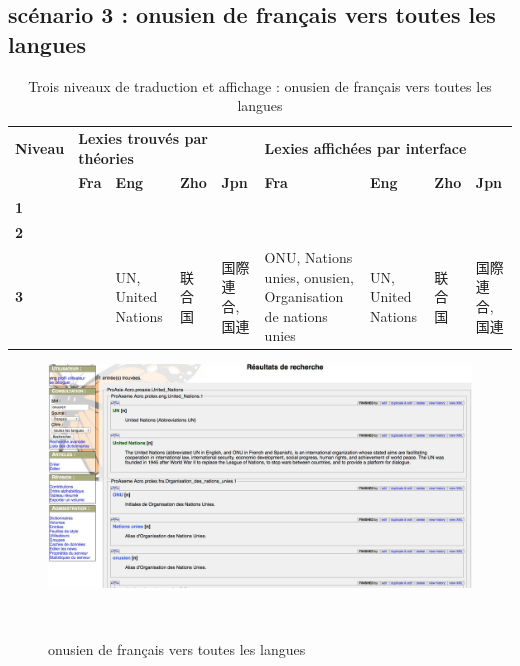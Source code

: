 \documentclass[10pt,a4paper,twoside]{article}
\newcommand{\Chinois}[1]{{\fontspec[Scale=0.9]{STSong}#1}}
\newcommand{\Japonais}[1]{{\fontspec[Scale=0.9]{Hiragino Kaku Gothic Pro}#1}}
\begin{document}
\subsection{scénario 3 :  onusien de français vers toutes les langues}
\begin{table}[!h]
\centering
	\begin{tabular}{|p{1cm}|p{1.8cm}|p{1cm}|p{1cm}|p{0.5cm}|p{1.8cm}|p{1cm}|p{1cm}|p{1cm}|}
	\hline
	\textbf{Niveau} & \multicolumn{4}{l|}{\textbf{ Lexies trouvés par théories}}&\multicolumn{4}{l|}{\textbf{Lexies affichées par interface}} \\
	\cline{2-9}
	&\textbf{Fra} & \textbf{Eng} & \textbf{Zho} & \textbf{Jpn} & \textbf{Fra} & \textbf{Eng}  & \textbf{Zho} & \textbf{Jpn} \\
	\hline
	\textbf{1} &  &  &  &  &  &  &  &   \\
	\hline
	\textbf{2} &  &  &  & &  &  &  & \\
	\hline
	\textbf{3} &  & \raggedright UN, United Nations & \raggedright \Chinois{联合国} &\raggedright \Japonais{国際連合}, \Japonais{国連} & \raggedright ONU, Nations unies, onusien, Organisation de nations unies  & \raggedright UN, United Nations &  \raggedright \Chinois{联合国} & \Japonais{国際連合}, \Japonais{国連} \\
	\hline
	\end{tabular}
\caption{Trois niveaux de traduction et affichage : onusien de français vers toutes les langues}\label{table}
\end{table}
\begin{figure}[htbp] 
\begin{center} 
\includegraphics[width=14cm]{images/scenario3.jpg}
\end{center} 
\caption{onusien de français vers toutes les langues} \label{image} \
\end{figure}
\end{document}
